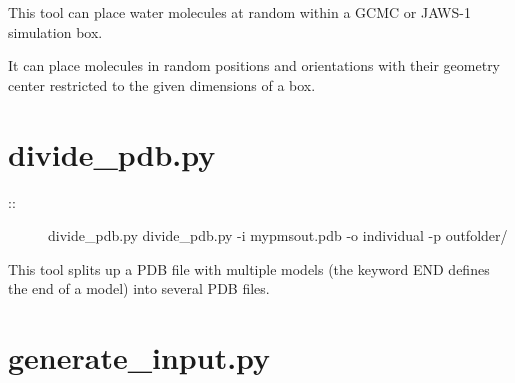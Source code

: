 \documentclass[letterpaper,10pt,english]{sphinxmanual}
\begin{document}

This tool can place water molecules at random within a GCMC or JAWS-1 simulation box.

It can place molecules in random positions and orientations with their geometry center restricted to the given dimensions of a box.


\section{divide\_pdb.py}
\label{\detokenize{tools:divide-pdb-py}}
\begin{description}
\item[{::}] \leavevmode
divide\_pdb.py
divide\_pdb.py -i mypmsout.pdb -o individual -p outfolder/

\end{description}


This tool splits up a PDB file with multiple models (the keyword END defines the end of a model) into several PDB files.


\section{generate\_input.py}
\label{\detokenize{tools:generate-input-py}}
\end{document}
